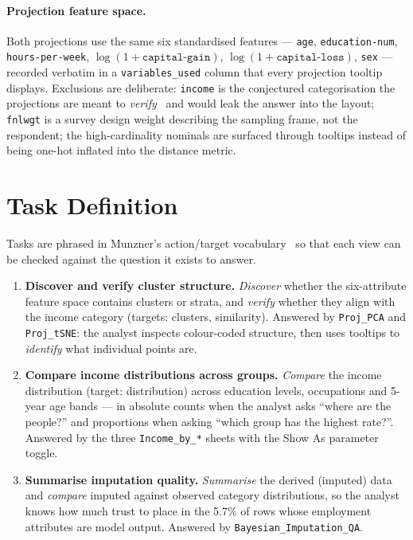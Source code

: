 \documentclass[11pt,a4paper]{article}
\begin{document}
\paragraph{Projection feature space.}
Both projections use the same six standardised features ---
\texttt{age}, \texttt{education-num}, \texttt{hours-per-week},
$\log(1{+}\texttt{capital-gain})$, $\log(1{+}\texttt{capital-loss})$,
\texttt{sex} --- recorded verbatim in a \texttt{variables\_used} column
that every projection tooltip displays. Exclusions are deliberate:
\texttt{income} is the conjectured categorisation the projections are meant
to \emph{verify}~\cite[\S13.4.3]{munzner} and would leak the answer into
the layout; \texttt{fnlwgt} is a survey design weight describing the
sampling frame, not the respondent; the high-cardinality nominals are
surfaced through tooltips instead of being one-hot inflated into the
distance metric.

\section{Task Definition}\label{sec:tasks}
Tasks are phrased in Munzner's action/target vocabulary~\cite[Ch.~3]{munzner}
so that each view can be checked against the question it exists to answer.

\begin{enumerate}
  \item \textbf{Discover and verify cluster structure.} \emph{Discover}
  whether the six-attribute feature space contains clusters or strata, and
  \emph{verify} whether they align with the income category
  (targets: clusters, similarity). Answered by \texttt{Proj\_PCA} and
  \texttt{Proj\_tSNE}: the analyst inspects colour-coded structure, then
  uses tooltips to \emph{identify} what individual points are.
  \item \textbf{Compare income distributions across groups.} \emph{Compare}
  the income distribution (target: distribution) across education levels,
  occupations and 5-year age bands --- in absolute counts when the analyst
  asks ``where are the people?'' and proportions when asking ``which group
  has the highest rate?''. Answered by the three \texttt{Income\_by\_*}
  sheets with the \textsf{Show As} parameter toggle.
  \item \textbf{Summarise imputation quality.} \emph{Summarise} the derived
  (imputed) data and \emph{compare} imputed against observed category
  distributions, so the analyst knows how much trust to place in the
  5.7\% of rows whose employment attributes are model output. Answered by
  \texttt{Bayesian\_Imputation\_QA}.
\end{enumerate}
\end{document}
